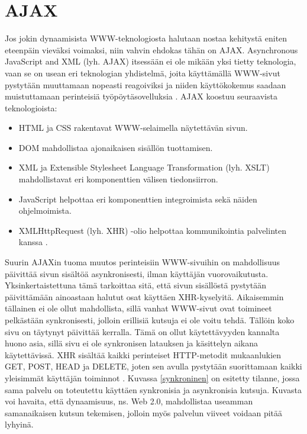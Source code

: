 \section {AJAX}

Jos jokin dynaamisista WWW-teknologiosta halutaan nostaa kehitystä eniten eteenpäin vieväksi voimaksi, niin vahvin ehdokas tähän on AJAX. Asynchronous JavaScript and XML (lyh. AJAX)
itsessään ei ole mikään yksi tietty teknologia, vaan se on usean eri teknologian yhdistelmä, joita käyttämällä WWW-sivut pystytään muuttamaan nopeasti reagoiviksi ja niiden 
käyttökokemus saadaan muistuttamaan perinteisiä työpöytäsovelluksia \cite{AJAX}. AJAX koostuu seuraavista teknologioista:

\begin{itemize}
\item HTML ja CSS rakentavat WWW-selaimella näytettävän sivun.
\item DOM mahdollistaa ajonaikaisen sisällön tuottamisen.
\item XML ja Extensible Stylesheet Language Transformation (lyh. XSLT)
  mahdollistavat eri komponenttien välisen tiedonsiirron.
\item JavaScript helpottaa eri komponenttien integroimista sekä näiden
  ohjelmoimista.
\item XMLHttpRequest (lyh. XHR) -olio helpottaa kommunikointia
  palvelinten kanssa \cite{WEB2b}.
\end{itemize}

Suurin AJAXin tuoma muutos perinteisiin WWW-sivuihin on mahdollisuus päivittää sivun sisältöä asynkronisesti, ilman käyttäjän vuorovaikutusta. Yksinkertaistettuna tämä tarkoittaa sitä,
että sivun sisällöstä pystytään päivittämään ainoastaan halutut osat käyttäen XHR-kyselyitä. Aikaisemmin tällainen ei ole ollut mahdollista, sillä vanhat WWW-sivut ovat toimineet 
pelkästään synkronisesti, jolloin erillisiä kutsuja ei ole voitu tehdä. Tällöin koko sivu on täytynyt päivittää kerralla. Tämä on ollut käytettävyyden kannalta huono asia,
sillä sivu ei ole synkronisen latauksen ja käsittelyn aikana käytettävissä. XHR sisältää kaikki perinteiset HTTP-metodit mukaanlukien GET, POST, HEAD ja DELETE, joten sen avulla 
pystytään suorittamaan kaikki yleisimmät käyttäjän toiminnot \cite{WEB2}. Kuvassa \ref{synkroninen} on esitetty tilanne, jossa sama palvelu on toteutettu käyttäen synkronisia ja 
asynkronisia kutsuja. Kuvasta voi havaita, että dynaamisuus, ns. Web 2.0, mahdollistaa useamman samanaikaisen kutsun tekemisen, jolloin myös palvelun viiveet voidaan pitää lyhyinä.

